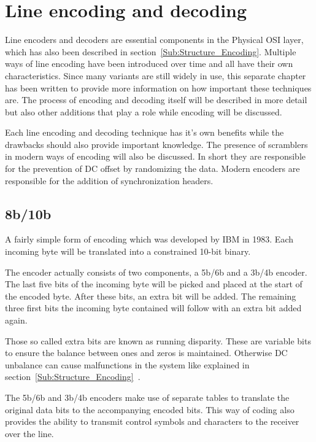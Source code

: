 \section{Line encoding and decoding}
\label{sec:encoding_decoding}

Line encoders and decoders are essential components in the Physical OSI layer, which has also been described in section~\ref{Sub:Structure_Encoding}. Multiple ways of line encoding have been introduced over time and all have their own characteristics. Since many variants are still widely in use, this separate chapter has been written to provide more information on how important these techniques are. The process of encoding and decoding itself will be described in more detail but also other additions that play a role while encoding will be discussed. 

Each line encoding and decoding technique has it's own benefits while the drawbacks should also provide important knowledge. The presence of scramblers in modern ways of encoding will also be discussed. In short they are responsible for the prevention of DC offset by randomizing the data. Modern encoders are responsible for the addition of synchronization headers.

\subsection{8b/10b}
A fairly simple form of encoding which was developed by IBM in 1983. Each incoming byte will be translated into a constrained 10-bit binary.

The encoder actually consists of two components, a 5b/6b and a 3b/4b encoder. The last five bits of the incoming byte will be picked and placed at the start of the encoded byte. After these bits, an extra bit will be added. The remaining three first bits the incoming byte contained will follow with an extra bit added again.

Those so called extra bits are known as running disparity. These are variable bits to ensure the balance between ones and zeros is maintained. Otherwise DC unbalance can cause malfunctions in the system like explained in section~\ref{Sub:Structure_Encoding}~\cite{8b10b}.

The 5b/6b and 3b/4b encoders make use of separate tables to translate the original data bits to the accompanying encoded bits. This way of coding also provides the ability to transmit control symbols and characters to the receiver over the line.

